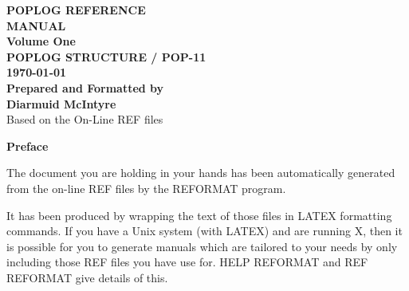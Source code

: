 






\begin{titlepage}
\begin{center}
\rule{0cm}{3cm}
{\Huge\bf POPLOG REFERENCE \\
\vspace{0.5cm}
MANUAL}\\
\vspace{3cm}
{\bf\Large
Volume One }\\
\vspace{1cm}
{\LARGE\bf POPLOG STRUCTURE / POP-11}\\
\vspace{1cm}
{\bf\Large \today }\\
\vspace{10cm}
{\LARGE\bf Prepared and Formatted by \\ Diarmuid McIntyre}\\
\vspace{1.5cm}
{\Large Based on the On-Line REF files \\}
\end{center}

\end{titlepage}



\rule{0cm}{3cm}
\begin{center}
{\Huge\bf Preface}
\end{center}
\vspace{1cm}

 The document you are holding in your hands has been automatically
generated from the on-line REF files by the REFORMAT program.

It has been produced by wrapping the text of those files in LATEX
formatting commands. If you have a Unix system (with LATEX) and are
running X, then it is possible for you to generate manuals which are
tailored to your needs by only including those REF files you have use
for. HELP REFORMAT and REF REFORMAT give details of this.


